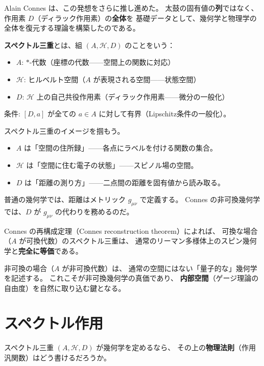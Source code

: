 Alain Connes は、この発想をさらに推し進めた。
太鼓の固有値の\textbf{列}ではなく、作用素 $D$（ディラック作用素）の\textbf{全体}を
基礎データとして、幾何学と物理学の全体を復元する理論を構築したのである。

\begin{dfnbox}
\textbf{スペクトル三重}とは、組 $(A, \mathcal{H}, D)$ のことをいう：
\begin{itemize}
  \item $A$: $*$-代数（座標の代数——空間上の関数に対応）
  \item $\mathcal{H}$: ヒルベルト空間（$A$ が表現される空間——状態空間）
  \item $D$: $\mathcal{H}$ 上の自己共役作用素（ディラック作用素——微分の一般化）
\end{itemize}
条件: $[D, a]$ が全ての $a\in A$ に対して有界（Lipschitz条件の一般化）。
\end{dfnbox}

\begin{hsbox}
スペクトル三重のイメージを掴もう。
\begin{itemize}
  \item $A$ は「空間の住所録」——各点にラベルを付ける関数の集合。
  \item $\mathcal{H}$ は「空間に住む電子の状態」——スピノル場の空間。
  \item $D$ は「距離の測り方」——二点間の距離を固有値から読み取る。
\end{itemize}
普通の幾何学では、距離はメトリック $g_{\mu\nu}$ で定義する。
Connes の非可換幾何学では、$D$ が $g_{\mu\nu}$ の代わりを務めるのだ。
\end{hsbox}

Connes の再構成定理（Connes reconstruction theorem）によれば、
可換な場合（$A$ が可換代数）のスペクトル三重は、
通常のリーマン多様体上のスピン幾何学と\textbf{完全に等価}である。

非可換の場合（$A$ が非可換代数）は、
通常の空間にはない「量子的な」幾何学を記述する。
これこそが非可換幾何学の真価であり、
\textbf{内部空間}（ゲージ理論の自由度）を自然に取り込む鍵となる。

\section{スペクトル作用}
\label{sec:3.2}

スペクトル三重 $(A, \mathcal{H}, D)$ が幾何学を定めるなら、
その上の\textbf{物理法則}（作用汎関数）はどう書けるだろうか。

